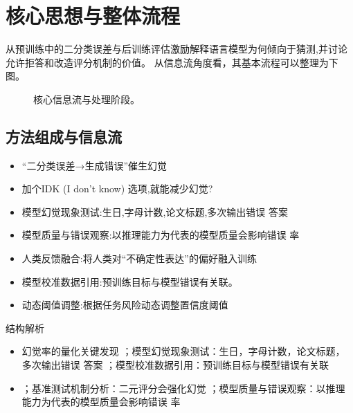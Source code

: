 \documentclass[UTF8,11pt,a4paper]{ctexart}
\begin{document}
\section{核心思想与整体流程}
从预训练中的二分类误差与后训练评估激励解释语言模型为何倾向于猜测,并讨论允许拒答和改造评分机制的价值。 从信息流角度看，其基本流程可以整理为下图。

\begin{figure}[H]
\centering
{}
\caption{核心信息流与处理阶段。}
\end{figure}

\subsection{方法组成与信息流}
\begin{itemize}
\item “二分类误差→生成错误”催生幻觉
\item 加个IDK (I don't know) 选项,就能减少幻觉?
\item 模型幻觉现象测试:生日,字母计数,论文标题,多次输出错误 答案
\item 模型质量与错误观察:以推理能力为代表的模型质量会影响错误 率
\item 人类反馈融合:将人类对“不确定性表达”的偏好融入训练
\item 模型校准数据引用:预训练目标与模型错误有关联。
\item 动态阈值调整:根据任务风险动态调整置信度阈值
\end{itemize}

\begin{keybox}{结构解析}
\begin{itemize}
\item 幻觉率的量化关键发现 ；模型幻觉现象测试：生日，字母计数，论文标题，多次输出错误 答案 ；模型校准数据引用：预训练目标与模型错误有关联
\item ；基准测试机制分析：二元评分会强化幻觉 ；模型质量与错误观察：以推理能力为代表的模型质量会影响错误 率
\end{itemize}
\end{keybox}
\end{document}
